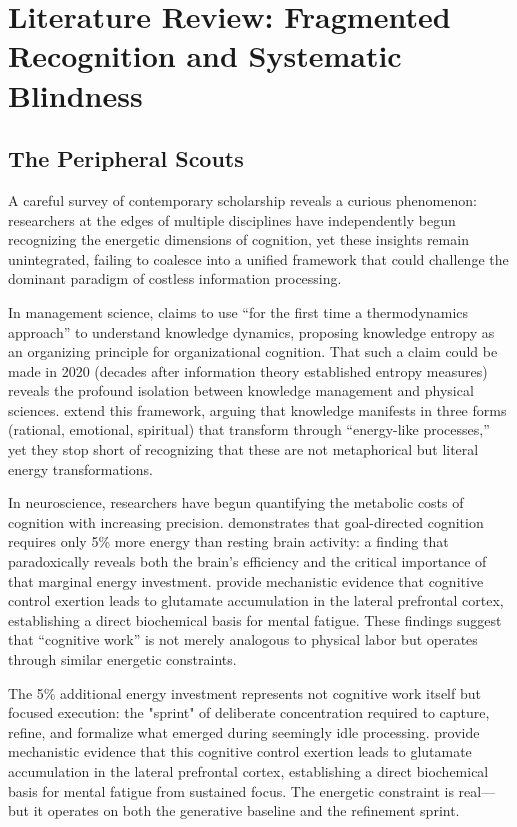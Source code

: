 \section{Literature Review: Fragmented Recognition and Systematic Blindness}
\label{sec:literature}

\subsection{The Peripheral Scouts}

A careful survey of contemporary scholarship reveals a curious phenomenon: researchers at the edges of multiple disciplines have independently begun recognizing the energetic dimensions of cognition, yet these insights remain unintegrated, failing to coalesce into a unified framework that could challenge the dominant paradigm of costless information processing.

In management science, \citet{bratianu2020} claims to use ``for the first time a thermodynamics approach'' to understand knowledge dynamics, proposing knowledge entropy as an organizing principle for organizational cognition. That such a claim could be made in 2020 (decades after information theory established entropy measures) reveals the profound isolation between knowledge management and physical sciences. \citet{bratianu2020b} extend this framework, arguing that knowledge manifests in three forms (rational, emotional, spiritual) that transform through ``energy-like processes,'' yet they stop short of recognizing that these are not metaphorical but literal energy transformations.

In neuroscience, researchers have begun quantifying the metabolic costs of cognition with increasing precision. \citet{jamadar2025} demonstrates that goal-directed cognition requires only 5\% more energy than resting brain activity: a finding that paradoxically reveals both the brain's efficiency and the critical importance of that marginal energy investment. \citet{wiehler2022} provide mechanistic evidence that cognitive control exertion leads to glutamate accumulation in the lateral prefrontal cortex, establishing a direct biochemical basis for mental fatigue. These findings suggest that ``cognitive work'' is not merely analogous to physical labor but operates through similar energetic constraints.

The 5\% additional energy investment represents not cognitive work itself but focused execution: the "sprint" of deliberate concentration required to capture, refine, and formalize what emerged during seemingly idle processing. \citet{wiehler2022} provide mechanistic evidence that this cognitive control exertion leads to glutamate accumulation in the lateral prefrontal cortex, establishing a direct biochemical basis for mental fatigue from sustained focus. The energetic constraint is real—but it operates on both the generative baseline and the refinement sprint.

